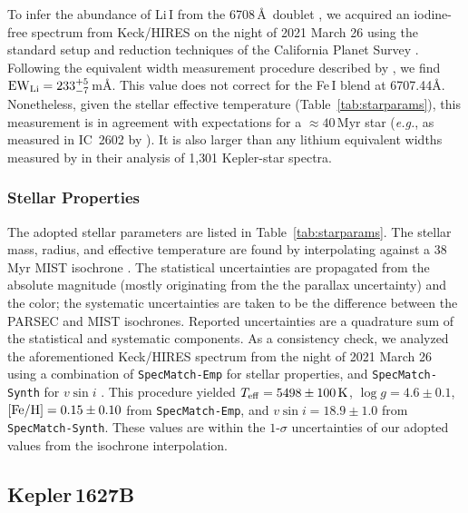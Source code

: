 \documentclass[12pt,modern,twocolumn,tighten]{aastex63}
\begin{document}
To infer the abundance of Li\,\textsc{I} from the 6708\,\AA\ doublet
\citep[{\it e.g.},][]{soderblom_ages_2014}, we acquired an iodine-free
spectrum from Keck/HIRES on the night of 2021 March 26 using the
standard setup and reduction techniques of the California Planet
Survey \citep{howard_cps_2010}.  Following the equivalent width
measurement procedure described by \citet{bouma_2021_ngc2516}, we find
${\rm EW}_{\rm Li} = 233^{+5}_{-7}$\,m\AA.   This value does not
correct for the Fe\,\textsc{I} blend at 6707.44\AA.  Nonetheless,
given the stellar effective temperature (Table~\ref{tab:starparams}),
this measurement is in agreement with expectations for a
$\approx40$\,Myr star ({\it e.g.}, as measured in IC~2602 by
\citealt{randich_gaiaeso_2018}).  It is also larger than any lithium
equivalent widths measured by \citet{berger_identifying_2018} in their
analysis of 1{,}301 Kepler-star spectra.


\subsubsection{Stellar Properties}

The adopted stellar parameters are listed in
Table~\ref{tab:starparams}.  The stellar mass, radius, and effective
temperature are found by interpolating against a 38$\,$Myr MIST
isochrone \citep{choi_mesa_2016}.  
The statistical uncertainties are propagated from the absolute
magnitude (mostly originating from the the parallax uncertainty) and the color; the systematic
uncertainties are taken to be the difference between the PARSEC
\citep{bressan_parsec_2012} and MIST isochrones.  Reported
uncertainties are a quadrature sum of the statistical and systematic
components.
As a consistency check, 
we analyzed the aforementioned Keck/HIRES spectrum from
the night of 2021 March 26 using a combination of
\texttt{SpecMatch-Emp} for stellar properties, and
\texttt{SpecMatch-Synth} for $v\sin i$
\citep{yee_SM_2017}.
This procedure yielded
$T_{\rm eff}=5498\pm100\,{\rm K}$,
$\log g=4.6\pm0.1$, $[{\rm Fe/H}]=0.15\pm0.10$ 
from \texttt{SpecMatch-Emp}, and $v\sin i = 18.9\pm1.0$ from
\texttt{SpecMatch-Synth}.
These values are within the $1$-$\sigma$ uncertainties of our adopted values from
the isochrone interpolation.


\subsection{Kepler\,1627B}
\end{document}

